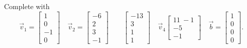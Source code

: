 \documentclass{ximera}
\begin{document}
\begin{exercise}
    Complete  with
    \begin{equation*}
        \vec{v}_1 = \begin{bmatrix} 1 \\ 0 \\ -1 \\ 0 \end{bmatrix} \quad \vec{v}_2 = \begin{bmatrix} -6 \\ 2 \\ 3 \\ -1 \end{bmatrix} \qquad \begin{bmatrix} -13 \\ 3 \\ 1 \\ 1 \end{bmatrix} \quad \vec{v}_4 \begin{bmatrix} 11 \ -1 \\ -5 \\ -1 \end{bmatrix} \quad \vec{b} = \begin{bmatrix} 1 \\ 0 \\ 0 \\ 0 \end{bmatrix}. 
    \end{equation*}
\end{exercise}
\end{document}
